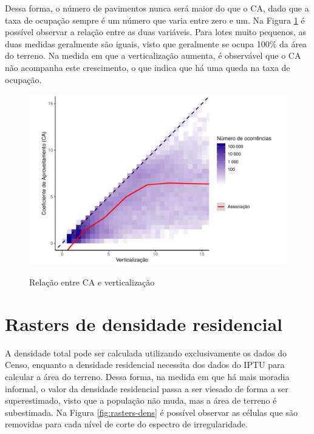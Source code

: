 \begin{apendicesenv}
Dessa forma, o número de pavimentos nunca será maior do que o CA, dado que a taxa de ocupação sempre é um número que varia entre zero e um. Na Figura \ref{fig:ca-vert} é possível observar a relação entre as duas variáveis. Para lotes muito pequenos, as duas medidas geralmente são iguais, visto que geralmente se ocupa 100\% da área do terreno. Na medida em que a verticalização aumenta, é observável que o CA não acompanha este crescimento, o que indica que há uma queda na taxa de ocupação.

\begin{figure}
    \centering
    \caption{Relação entre CA e verticalização}
    \includegraphics[width = \textwidth]{imagens/ca_vs_verticalizacao.pdf}
    \label{fig:ca-vert}
\end{figure}

\chapter{Rasters de densidade residencial}
\label{appendix:rasters-corte}

A densidade total pode ser calculada utilizando exclusivamente os dados do Censo, enquanto a densidade residencial necessita dos dados do IPTU para calcular a área do terreno. Dessa forma, na medida em que há mais moradia informal, o valor da densidade residencial passa a ser viesado de forma a ser superestimado, visto que a população não muda, mas a área de terreno é subestimada. Na Figura \ref{fig:rasters-dens} é possível observar as células que são removidas para cada nível de corte do espectro de irregularidade.


\end{apendicesenv}
